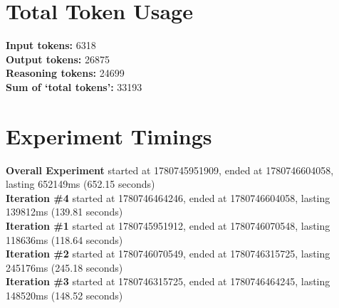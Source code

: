 \documentclass{article}
\begin{document}
\section*{Total Token Usage}
\textbf{Input tokens: }6318
\\\textbf{Output tokens: }26875
\\\textbf{Reasoning tokens: }24699
\\\textbf{Sum of `total tokens': }33193
\section*{Experiment Timings}
\textbf{Overall Experiment} started at 1780745951909, ended at 1780746604058, lasting 652149ms (652.15 seconds)
\\\textbf{Iteration \#4} started at 1780746464246, ended at 1780746604058, lasting 139812ms (139.81 seconds)
\\\textbf{Iteration \#1} started at 1780745951912, ended at 1780746070548, lasting 118636ms (118.64 seconds)
\\\textbf{Iteration \#2} started at 1780746070549, ended at 1780746315725, lasting 245176ms (245.18 seconds)
\\\textbf{Iteration \#3} started at 1780746315725, ended at 1780746464245, lasting 148520ms (148.52 seconds)
\end{document}
